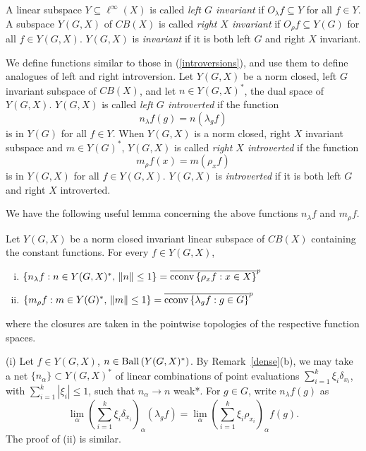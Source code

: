 A linear subspace $Y \subseteq \ell^\infty(X)$ is called {\it left $G$ invariant} if
$O_\lambda f \subseteq Y$ for all $f\in Y$.
A subspace $Y(G,X)$ of $CB(X)$ is called {\it right $X$ invariant} if
$O_\rho f \subseteq Y(G)$ for all $f\in Y(G,X)$.
$Y(G,X)$ is {\it invariant} if it is both left $G$ and right $X$ invariant.

We define functions similar to those in (\ref{introversions}),
and use them to define analogues of left and right introversion.
Let $Y(G,X)$ be a norm closed, left $G$ invariant subspace of $CB(X)$, and
let $n\in Y(G,X)^*$, the dual space of $Y(G,X)$.
$Y(G,X)$ is called {\it left $G$ introverted}
if the function
\[
n_\lambda f(g) = n(\lambda_g f)
\]
is in $Y(G)$ for all $f\in Y$.
When $Y(G,X)$ is a norm closed, right $X$ invariant subspace and $m\in Y(G)^*$,
$Y(G,X)$ is called {\it right $X$ introverted}
if the function
\[
m_\rho f(x) = m(\rho_x f)
\]
is in $Y(G,X)$ for all $f\in Y(G,X)$.
$Y(G,X)$ is {\it introverted} if it is both left $G$ and right $X$ introverted.


We have the following useful lemma concerning the above functions $n_\lambda f$ and $m_\rho f$.
\begin{lemma}\label{conv}
Let $Y(G,X)$ be a norm closed invariant linear subspace of $CB(X)$ containing the constant functions.
For every $f\in Y(G,X)$,
\begin{enumerate}[(i)]
\item $\{n_\lambda f : n\in Y(G,X)^*,\,\|n\| \leq 1 \} = \overline{\operatorname{cconv\,}\{\rho_x f: x\in X\}}^p$
\item $\{m_\rho f : m\in Y(G)^*,\,\|m\| \leq 1 \} = \overline{\operatorname{cconv\,}\{\lambda_g f: g\in G\}}^p$
\end{enumerate}
where the closures are taken in the pointwise topologies of the respective function spaces.
\end{lemma}
\proof
(i) Let $f\in Y(G,X)$, $n\in \operatorname{Ball\,}(Y(G,X)^*)$.  By Remark~\ref{dense}(b), we may take a net
$\{n_\alpha\} \subset Y(G,X)^*$ of linear combinations of
point evaluations $\sum_{i=1}^k \xi_i \delta_{x_i}$, with $\sum_{i=1}^k | \xi_i | \leq 1$, such that
$n_\alpha \rightarrow n$ weak*.  For $g\in G$, write $n_\lambda f(g)$ as
\[
\lim_\alpha \left(\sum_{i=1}^k \xi_i \delta_{x_i}\right)_\alpha (\lambda_g f) =
\lim_\alpha \left(\sum_{i=1}^k \xi_i \rho_{x_i}\right)_\alpha f(g).
\]
The proof of (ii) is similar.
\done

